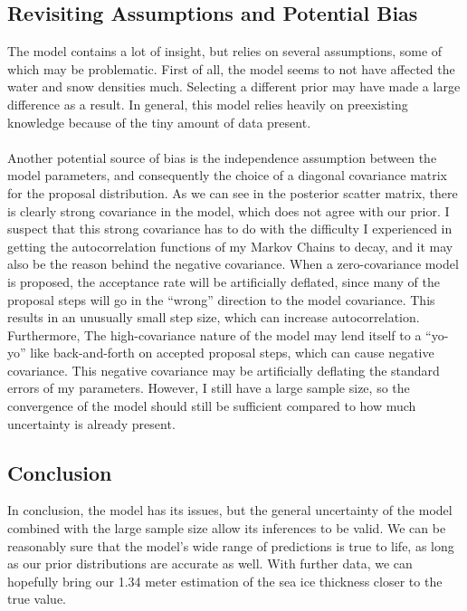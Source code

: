 \documentclass[12pt, letterpaper]{article}
\begin{document}
\subsection{Revisiting Assumptions and Potential Bias}
The model contains a lot of insight, but relies on several assumptions, some of which may be problematic. First of all,
the model seems to not have affected the water and snow densities much. Selecting a different prior may have made a large difference
as a result. In general, this model relies heavily on preexisting knowledge because of the tiny amount of data present.
\\\\
Another potential source of bias is the independence assumption between the model parameters, and consequently the choice
of a diagonal covariance matrix for the proposal distribution. As we can see in the posterior scatter matrix, there is clearly
strong covariance in the model, which does not agree with our prior. I suspect that this strong covariance has to do with the difficulty I
experienced in getting the autocorrelation functions of my Markov Chains to decay, and it may also be the reason behind the negative covariance.
When a zero-covariance model is proposed, the acceptance rate will be artificially deflated, since many of the proposal steps will go in the
``wrong'' direction to the model covariance. This results in an unusually small step size, which can increase autocorrelation. Furthermore,
The high-covariance nature of the model may lend itself to a ``yo-yo'' like back-and-forth on accepted proposal steps, which can cause negative
covariance. This negative covariance may be artificially deflating the standard errors of my parameters. However, I still have a large sample size,
so the convergence of the model should still be sufficient compared to how much uncertainty is already present.

\subsection{Conclusion}
In conclusion, the model has its issues, but the general uncertainty of the model combined with the large sample size allow its inferences to be valid.
We can be reasonably sure that the model's wide range of predictions is true to life, as long as our prior distributions are accurate as well.
With further data, we can hopefully bring our 1.34 meter estimation of the sea ice thickness closer to the true value.
\end{document}
